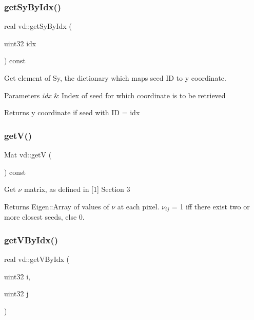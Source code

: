 \subsubsection{\texorpdfstring{get\+Sy\+By\+Idx()}{getSyByIdx()}}
{\footnotesize\ttfamily real vd\+::get\+Sy\+By\+Idx (\begin{DoxyParamCaption}\item[{uint32}]{idx }\end{DoxyParamCaption}) const}

Get element of Sy, the dictionary which maps seed ID to y coordinate. 
\begin{DoxyParams}{Parameters}
{\em idx} & Index of seed for which coordinate is to be retrieved \\
\hline
\end{DoxyParams}
\begin{DoxyReturn}{Returns}
y coordinate if seed with ID = idx 
\end{DoxyReturn}
\mbox{\label{classvd_aad4ea5c045b8380f83b0490af2fee0fa}} 
\subsubsection{\texorpdfstring{get\+V()}{getV()}}
{\footnotesize\ttfamily Mat vd\+::getV (\begin{DoxyParamCaption}{ }\end{DoxyParamCaption}) const}

Get $\nu$ matrix, as defined in \mbox{[}1\mbox{]} Section 3 \begin{DoxyReturn}{Returns}
Eigen\+::\+Array of values of $\nu$ at each pixel. $\nu_{ij}$ = 1 iff there exist two or more closest seeds, else 0. 
\end{DoxyReturn}
\mbox{\label{classvd_a27d44f2c94b55723e9982446696b5cee}} 
\subsubsection{\texorpdfstring{get\+V\+By\+Idx()}{getVByIdx()}}
{\footnotesize\ttfamily real vd\+::get\+V\+By\+Idx (\begin{DoxyParamCaption}\item[{uint32}]{i,  }\item[{uint32}]{j }\end{DoxyParamCaption})}

